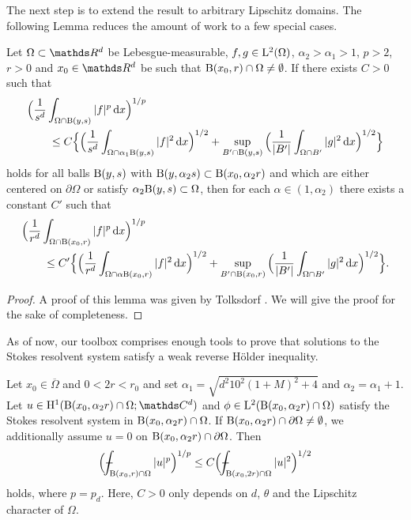 The next step is to extend the result to arbitrary Lipschitz domains. The following Lemma reduces the amount of work to a few special cases.

\begin{lem}[Tolksdorf]
  \label{lem:ballsforballs}
  Let $\Omega \subset \R^d$ be Lebesgue-measurable, $f, g \in \mathrm{L}^2(\Omega)$, $\alpha_2 > \alpha_1 > 1$, $p > 2$, $r > 0$ and $x_0 \in \R^d$ be such that $\mathrm{B}(x_0, r) \cap \Omega \neq \emptyset$.
  If there exists $C > 0$ such that
  \begin{align*}
    &\Big( \frac{1}{s^d} \int_{\Omega \cap \mathrm{B}(y, s)} |f|^p \, {\operatorname{d}\!{x}} \Big)^{1/p} \\
    &\qquad\leq C \Big\{ \Big( \frac{1}{s^d} \int_{\Omega \cap \alpha_1 \mathrm{B}(y, s)} |f|^2 \, {\operatorname{d}\!{x}} \Big)^{1/2} + \sup_{B' \cap \mathrm{B}(y,s)} \Big( \frac{1}{|B'|} \int_{\Omega \cap B'} |g|^2 \, {\operatorname{d}\!{x}} \Big)^{1/2} \Big\}
  \end{align*}
  holds for all balls $\mathrm{B}(y,s)$ with $\mathrm{B}(y,\alpha_2 s) \subset \mathrm{B}(x_0, \alpha_2 r)$ and which are either centered on $\partial\Omega$ or satisfy $\alpha_2 \mathrm{B}(y,s) \subset \Omega$, then for each $\alpha \in (1,\alpha_2)$ there exists a constant $C'$ such that
  \begin{align*}
    &\Big( \frac{1}{r^d} \int_{\Omega \cap \mathrm{B}(x_0, r)} |f|^p \, {\operatorname{d}\!{x}} \Big)^{1/p} 
    \\
    &\qquad\leq C' \Big\{ \Big( \frac{1}{r^d} \int_{\Omega \cap \alpha \mathrm{B}(x_0, r)} |f|^2 \, {\operatorname{d}\!{x}} \Big)^{1/2} + \sup_{B' \cap \mathrm{B}(x_0,r)} \Big( \frac{1}{|B'|} \int_{\Omega \cap B'} |g|^2 \, {\operatorname{d}\!{x}} \Big)^{1/2} \Big\}.
  \end{align*}
\end{lem}

\begin{proof}
  A proof of this lemma was given by Tolksdorf \cite{tolksdorf2017}.
  We will give the proof for the sake of completeness.
\end{proof}

As of now, our toolbox comprises enough tools to prove that solutions to the Stokes resolvent system satisfy a weak reverse H\"older inequality.

\begin{lem}
  \label{lem:reverseHoelder}
  Let $x_0 \in \overline\Omega$ and $0 < 2r < r_0$ and set $\alpha_1 = \sqrt{d^2 10^2 (1 + M)^2 + 4}$ and $\alpha_2 = \alpha_1 + 1$.
  Let $u \in \HH^1(\BB(x_0,  \alpha_2 r) \cap \Omega; \C^d)$ and $\phi \in \mathrm{L}^2(\mathrm{B}(x_0, \alpha_2 r) \cap \Omega)$ satisfy the Stokes resolvent system in $\mathrm{B}(x_0, \alpha_2 r) \cap \Omega$. 
  If $\mathrm{B}(x_0, \alpha_2 r) \cap \partial \Omega \neq \emptyset $, we additionally assume $u = 0$ on $\mathrm{B}(x_0, \alpha_2 r) \cap \partial\Omega$.
  Then
  \begin{align}
    \label{eq:reverseHoelder}
    \Big( \dashint_{\BB(x_0, r) \cap \Omega} |u|^p \Big)^{1/p} \leq C \Big( \dashint_{\BB(x_0, 2 r) \cap \Omega} |u|^2 \Big)^{1/2}
  \end{align}
  holds, where $p = p_d$.
  Here, $C > 0$ only depends on $d$, $\theta$ and the Lipschitz character of $\Omega$.
\end{lem}

